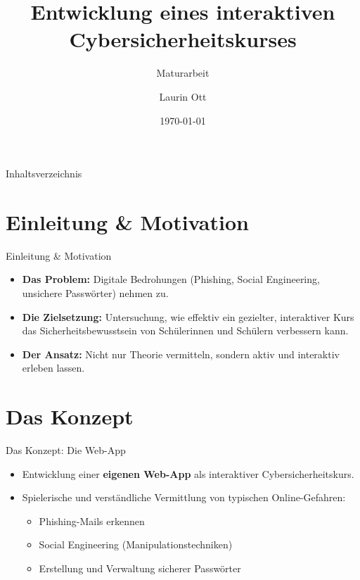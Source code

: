 \documentclass[aspectratio=169]{beamer}
\title[Cybersicherheitskurs]{Entwicklung eines interaktiven Cybersicherheitskurses}
\subtitle{Maturarbeit}
\author{Laurin Ott}
\institute{Kantonsschule Im Lee, Winterthur}
\date{\today}
\begin{document}
\begin{frame}
    \titlepage
\end{frame}

\begin{frame}{Inhaltsverzeichnis}
    \tableofcontents
\end{frame}

\section{Einleitung \& Motivation}
\begin{frame}{Einleitung \& Motivation}
    \begin{itemize}
        \item \textbf{Das Problem:} Digitale Bedrohungen (Phishing, Social Engineering, unsichere Passwörter) nehmen zu.
        \item \textbf{Die Zielsetzung:} Untersuchung, wie effektiv ein gezielter, interaktiver Kurs das Sicherheitsbewusstsein von Schülerinnen und Schülern verbessern kann.
        \item \textbf{Der Ansatz:} Nicht nur Theorie vermitteln, sondern aktiv und interaktiv erleben lassen.
    \end{itemize}
\end{frame}

\section{Das Konzept}
\begin{frame}{Das Konzept: Die Web-App}
    \begin{itemize}
        \item Entwicklung einer \textbf{eigenen Web-App} als interaktiver Cybersicherheitskurs.
        \item Spielerische und verständliche Vermittlung von typischen Online-Gefahren:
        \begin{itemize}
            \item Phishing-Mails erkennen
            \item Social Engineering (Manipulationstechniken)
            \item Erstellung und Verwaltung sicherer Passwörter
        \end{itemize}
    \end{itemize}
\end{frame}
\end{document}
